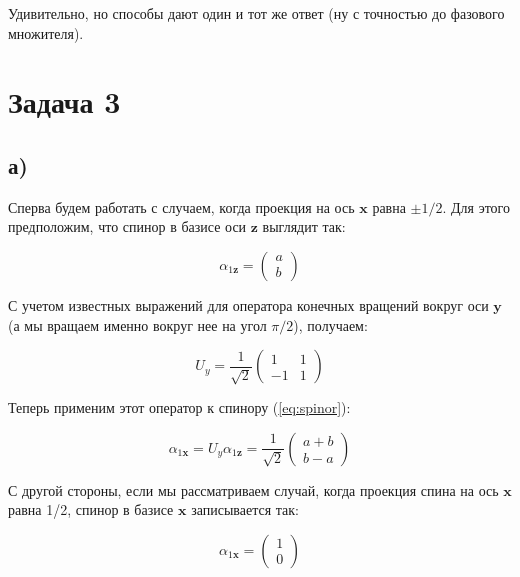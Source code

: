 \documentclass[a4paper, 12pt]{article}
\begin{document}
Удивительно, но способы дают один и тот же ответ (ну с точностью до фазового множителя).

\section*{Задача 3}
\subsection*{а)}

Сперва будем работать с случаем, когда проекция на ось $\mathbf{x}$ равна $\pm 1/2$. Для этого предположим, что спинор в базисе оси $\mathbf{z}$ выглядит так:

\begin{equation}
	\alpha_{1\mathbf{z}} = 
	\begin{pmatrix}
		a \\
		b
	\end{pmatrix}
	\label{eq:spinor}
\end{equation}

С учетом известных выражений для оператора конечных вращений вокруг оси $\mathbf{y}$ (а мы вращаем именно вокруг нее на угол $\pi/2$), получаем:

\begin{equation*}
	U_y = \frac{1}{\sqrt{2}}
	\begin{pmatrix}
		1 & 1\\
		-1 & 1
	\end{pmatrix}
\end{equation*}

Теперь применим этот оператор к спинору (\ref{eq:spinor}):

\begin{equation}
	\alpha_{1\mathbf{x}} = U_y \alpha_{1\mathbf{z}} = \frac{1}{\sqrt{2}} 
	\begin{pmatrix}
		a + b \\
		b - a
	\end{pmatrix}
	\label{eq:left}
\end{equation}

С другой стороны, если мы рассматриваем случай, когда проекция спина на ось $\mathbf{x}$ равна 1/2, спинор в базисе $\mathbf{x}$ записывается так:

\begin{equation}
	\alpha_{1\mathbf{x}} = 
	\begin{pmatrix}
		1\\
		0
	\end{pmatrix}
	\label{eq:right}
\end{equation}
\end{document}
